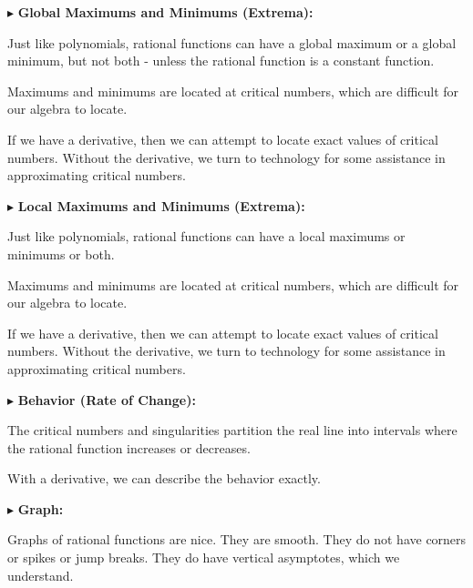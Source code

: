 \documentclass{ximera}
\begin{document}
$\blacktriangleright$ \textbf{\textcolor{red!10!blue!90!}{Global Maximums and Minimums (Extrema):}} 

Just like polynomials, rational functions can have a global maximum or a global minimum, but not both - unless the rational function is a constant function.

Maximums and minimums are located at critical numbers, which are difficult for our algebra to locate.


If we have a derivative, then we can attempt to locate exact values of critical numbers.  Without the derivative, we turn to technology for some assistance in approximating critical numbers.









$\blacktriangleright$ \textbf{\textcolor{red!10!blue!90!}{Local Maximums and Minimums (Extrema):}} 

Just like polynomials, rational functions can have a local maximums or minimums or both.

Maximums and minimums are located at critical numbers, which are difficult for our algebra to locate.


If we have a derivative, then we can attempt to locate exact values of critical numbers.  Without the derivative, we turn to technology for some assistance in approximating critical numbers.






$\blacktriangleright$ \textbf{\textcolor{red!10!blue!90!}{Behavior (Rate of Change):}} 


The critical numbers and singularities partition the real line into intervals where the rational function increases or decreases.  

With a derivative, we can describe the behavior exactly.

















$\blacktriangleright$ \textbf{\textcolor{red!10!blue!90!}{Graph:}} 


Graphs of rational functions are nice.  They are smooth.  They do not have corners or spikes or jump breaks. They do have vertical asymptotes, which we understand.
\end{document}

